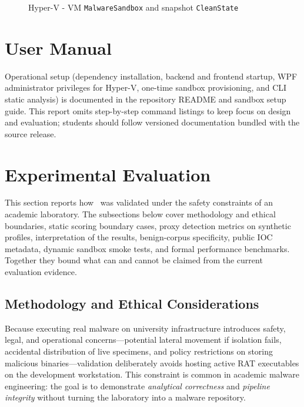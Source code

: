 \begin{figure}[H]
    \centering
    \caption{Hyper-V - VM \texttt{MalwareSandbox} and snapshot \texttt{CleanState}}
    \label{fig:hyperv-vm}
\end{figure}

\section{User Manual}

Operational setup (dependency installation, backend and frontend startup, WPF administrator
privileges for Hyper-V, one-time sandbox provisioning, and CLI static analysis) is documented in
the repository README and sandbox setup guide. This report omits step-by-step command listings to
keep focus on design and evaluation; students should follow versioned documentation bundled with
the source release.

\section{Experimental Evaluation}

This section reports how \rat\ was validated under the safety constraints of an academic
laboratory. The subsections below cover methodology and ethical boundaries, static scoring
boundary cases, proxy detection metrics on synthetic profiles, interpretation of the results,
benign-corpus specificity, public IOC metadata, dynamic sandbox smoke tests, and formal
performance benchmarks. Together they bound what can and cannot be claimed from the current
evaluation evidence.

\subsection{Methodology and Ethical Considerations}

Because executing real malware on university infrastructure introduces safety, legal, and
operational concerns---potential lateral movement if isolation fails, accidental distribution of
live specimens, and policy restrictions on storing malicious binaries---validation deliberately
avoids hosting active RAT executables on the development workstation. This constraint is common in
academic malware engineering: the goal is to demonstrate \emph{analytical correctness} and
\emph{pipeline integrity} without turning the laboratory into a malware repository.

